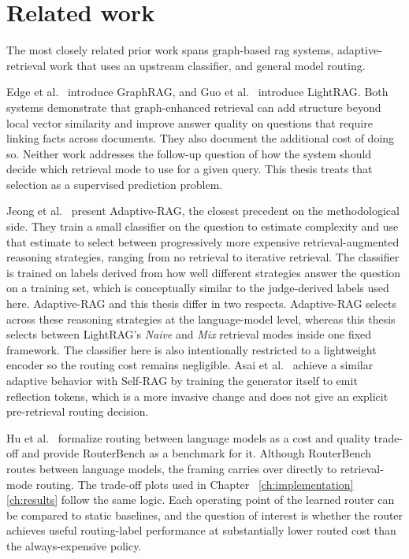 \documentclass[english, bibtex]{kththesis}               %
\numberwithin{listing}{chapter}
\providecommand{\DIFaddtex}[1]{{\protect\color{blue} \sf #1}} %
\providecommand{\DIFdeltex}[1]{{\protect\color{red} \scriptsize #1}} %
\providecommand{\DIFaddbegin}{} %
\providecommand{\DIFaddend}{} %
\providecommand{\DIFdelbegin}{} %
\providecommand{\DIFdelend}{} %
\providecommand{\DIFadd}[1]{\texorpdfstring{\DIFaddtex{#1}}{#1}} %
\providecommand{\DIFdel}[1]{\texorpdfstring{\DIFdeltex{#1}}{}} %
\begin{document}
\section{Related work}
\label{sec:relatedWork}

The most closely related prior work spans graph-based \gls{rag} systems, adaptive-retrieval work that uses an upstream classifier, and general model routing.

Edge et al.\ \cite{edge2024graphrag} introduce GraphRAG, and Guo et al.\ \cite{lightrag2024} introduce LightRAG. Both systems demonstrate that graph-enhanced retrieval can add structure beyond local vector similarity and improve answer quality on questions that require linking facts across documents. They also document the additional cost of doing so. Neither work addresses the follow-up question of how the system should decide which retrieval mode to use for a given query. This thesis treats that selection as a supervised prediction problem.

Jeong et al.\ \cite{jeong2024adaptiverag} present Adaptive-RAG, the closest precedent on the methodological side. They train a small classifier on the question to estimate complexity and use that estimate to select between progressively more expensive retrieval-augmented reasoning strategies, ranging from no retrieval to iterative retrieval. The classifier is trained on labels derived from how well different strategies answer the question on a training set, which is conceptually similar to the judge-derived labels used here. Adaptive-RAG and this thesis differ in two respects. Adaptive-RAG selects across these reasoning strategies at the language-model level, whereas this thesis selects between LightRAG's \emph{Naive} and \emph{Mix} retrieval modes inside one fixed framework. The classifier here is also intentionally restricted to a lightweight encoder so the routing cost remains negligible. Asai et al.\ \cite{asai2023selfrag} achieve a similar adaptive behavior with Self-RAG by training the generator itself to emit reflection tokens, which is a more invasive change and does not give an explicit pre-retrieval routing decision.

Hu et al.\ \cite{hu2024routerbench} formalize routing between language models as a cost and quality trade-off and provide RouterBench as a benchmark for it. Although RouterBench routes between language models, the framing carries over directly to retrieval-mode routing. The trade-off plots used in Chapter~\DIFdelbegin \DIFdel{\ref{ch:implementation} }\DIFdelend \DIFaddbegin \DIFadd{\ref{ch:results} }\DIFaddend follow the same logic. Each operating point of the learned router can be compared to static baselines, and the question of interest is whether the router achieves useful routing-label performance at substantially lower routed cost than the always-expensive policy.
\end{document}
